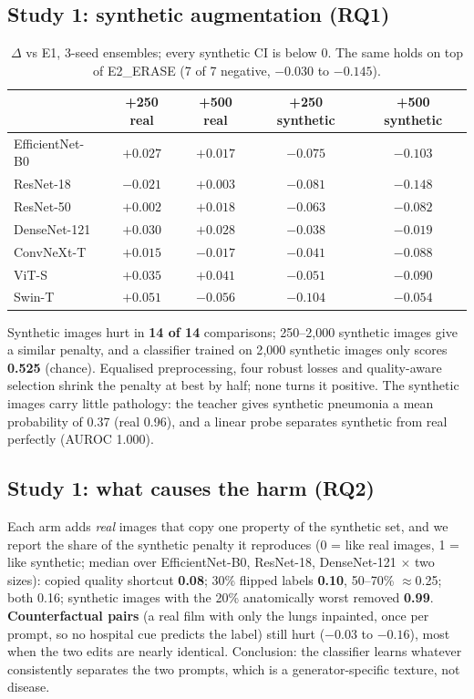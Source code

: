 \documentclass[11pt,a4paper]{article}
\begin{document}
\subsection{Study 1: synthetic augmentation (RQ1)}
\begin{table}[h]\centering\small
\begin{tabular}{lcccc}\toprule
 & +250 real & +500 real & \textbf{+250 synthetic} & \textbf{+500 synthetic}\\\midrule
EfficientNet-B0 & $+0.027$ & $+0.017$ & $\mathbf{-0.075}$ & $\mathbf{-0.103}$\\
ResNet-18 & $-0.021$ & $+0.003$ & $\mathbf{-0.081}$ & $\mathbf{-0.148}$\\
ResNet-50 & $+0.002$ & $+0.018$ & $\mathbf{-0.063}$ & $\mathbf{-0.082}$\\
DenseNet-121 & $+0.030$ & $+0.028$ & $\mathbf{-0.038}$ & $\mathbf{-0.019}$\\
ConvNeXt-T & $+0.015$ & $-0.017$ & $\mathbf{-0.041}$ & $\mathbf{-0.088}$\\
ViT-S & $+0.035$ & $+0.041$ & $\mathbf{-0.051}$ & $\mathbf{-0.090}$\\
Swin-T & $+0.051$ & $-0.056$ & $\mathbf{-0.104}$ & $\mathbf{-0.054}$\\\bottomrule
\end{tabular}
\caption{$\Delta$ vs E1, 3-seed ensembles; every synthetic CI is below 0. The same holds on top of E2\_ERASE (7 of 7 negative, $-0.030$ to $-0.145$).}\label{tab:e3e4}
\end{table}
Synthetic images hurt in \textbf{14 of 14} comparisons; 250--2{,}000 synthetic images give a similar penalty, and a classifier trained on 2{,}000 synthetic images only scores \textbf{0.525} (chance). Equalised preprocessing, four robust losses and quality-aware selection shrink the penalty at best by half; none turns it positive. The synthetic images carry little pathology: the teacher gives synthetic pneumonia a mean probability of 0.37 (real 0.96), and a linear probe separates synthetic from real perfectly (AUROC 1.000).

\subsection{Study 1: what causes the harm (RQ2)}
Each arm adds \emph{real} images that copy one property of the synthetic set, and we report the share of the synthetic penalty it reproduces (0 = like real images, 1 = like synthetic; median over EfficientNet-B0, ResNet-18, DenseNet-121 $\times$ two sizes): copied quality shortcut \textbf{0.08}; 30\% flipped labels \textbf{0.10}, 50--70\% $\approx$0.25; both 0.16; synthetic images with the 20\% anatomically worst removed \textbf{0.99}. \textbf{Counterfactual pairs} (a real film with only the lungs inpainted, once per prompt, so no hospital cue predicts the label) still hurt ($-0.03$ to $-0.16$), most when the two edits are nearly identical. Conclusion: the classifier learns whatever consistently separates the two prompts, which is a generator-specific texture, not disease.
\end{document}
